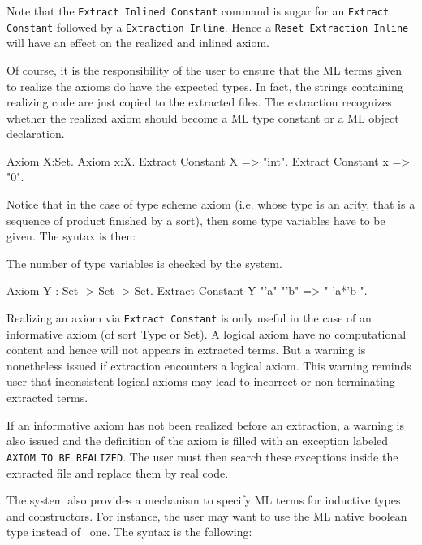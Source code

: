 Note that the {\tt Extract Inlined Constant} command is sugar
for an {\tt Extract Constant} followed by a {\tt Extraction Inline}. 
Hence a {\tt Reset Extraction Inline} will have an effect on the
realized and inlined axiom.

Of course, it is the responsibility of the user to ensure that the ML
terms given to realize the axioms do have the expected types.  In
fact, the strings containing realizing code are just copied to the
extracted files. The extraction recognizes whether the realized axiom
should become a ML type constant or a ML object declaration.

\Example
\begin{coq_example*}
Axiom X:Set.
Axiom x:X.
Extract Constant X => "int".
Extract Constant x => "0".
\end{coq_example*}

Notice that in the case of type scheme axiom (i.e. whose type is an
arity, that is a sequence of product finished by a sort), then some type
variables have to be given. The syntax is then:

\begin{description}
\item{}
\end{description}

The number of type variables is checked by the system. 

\Example
\begin{coq_example*}
Axiom Y : Set -> Set -> Set.
Extract Constant Y "'a" "'b" => " 'a*'b ".
\end{coq_example*}

Realizing an axiom via {\tt Extract Constant} is only useful in the
case of an informative axiom (of sort Type or Set). A logical axiom
have no computational content and hence will not appears in extracted
terms. But a warning is nonetheless issued if extraction encounters a
logical axiom. This warning reminds user that inconsistent logical
axioms may lead to incorrect or non-terminating extracted terms.

If an informative axiom has not been realized before an extraction, a
warning is also issued and the definition of the axiom is filled with
an exception labeled {\tt AXIOM TO BE REALIZED}. The user must then
search these exceptions inside the extracted file and replace them by
real code.


The system also provides a mechanism to specify ML terms for inductive
types and constructors.  For instance, the user may want to use the ML
native boolean type instead of \Coq\ one.  The syntax is the following:

